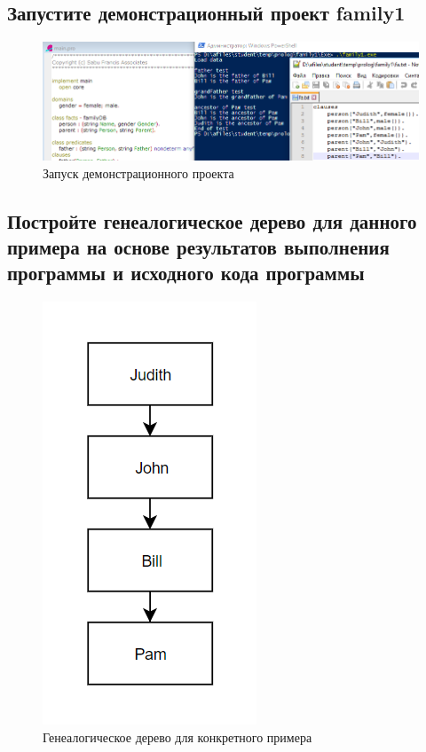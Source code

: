 \documentclass[14pt,a4paper,report]{report}
\begin{document}
\subsection{Запустите демонстрационный проект family1}

\begin{figure}[h!]
	\centering
	\includegraphics[scale = 0.75]{images/1.png}
	\caption{Запуск демонстрационного проекта}
\end{figure}

\subsection{Постройте генеалогическое дерево для данного примера на основе результатов выполнения программы и исходного кода программы}

\begin{figure}[h!]
	\centering
	\includegraphics[scale = 0.65]{images/2.png}
	\caption{Генеалогическое дерево для конкретного примера}
\end{figure}
\end{document}
